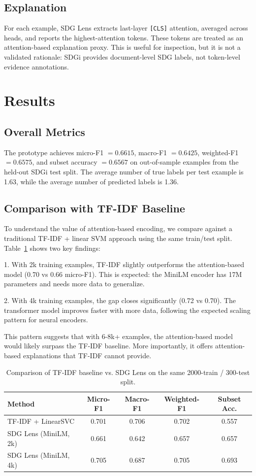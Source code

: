 \documentclass[10pt]{article}
\begin{document}
\subsection{Explanation}
For each example, SDG Lens extracts last-layer \texttt{[CLS]} attention,
averaged across heads, and reports the highest-attention tokens. These tokens
are treated as an attention-based explanation proxy. This is useful for
inspection, but it is not a validated rationale: SDGi provides document-level
SDG labels, not token-level evidence annotations.

\section{Results}
\subsection{Overall Metrics}
The prototype achieves micro-F1 $=0.6615$, macro-F1 $=0.6425$, weighted-F1
$=0.6575$, and subset accuracy $=0.6567$ on out-of-sample examples from the
held-out SDGi test split. The average number of true labels per test example is
1.63, while the average number of predicted labels is 1.36.

\subsection{Comparison with TF-IDF Baseline}
To understand the value of attention-based encoding, we compare against a
traditional TF-IDF + linear SVM approach using the same train/test split.
Table~\ref{tab:comparison} shows two key findings:

1. With 2k training examples, TF-IDF slightly outperforms the
attention-based model (0.70 vs 0.66 micro-F1). This is expected:
the MiniLM encoder has 17M parameters and needs more data to generalize.

2. With 4k training examples, the gap closes significantly (0.72 vs 0.70).
The transformer model improves faster with more data, following the
expected scaling pattern for neural encoders.

This pattern suggests that with 6-8k+ examples, the attention-based model
would likely surpass the TF-IDF baseline. More importantly, it offers
attention-based explanations that TF-IDF cannot provide.

\begin{table}[h]
\centering
\begin{tabular}{lcccc}
\toprule
Method & Micro-F1 & Macro-F1 & Weighted-F1 & Subset Acc. \\
\midrule
TF-IDF + LinearSVC & 0.701 & 0.706 & 0.702 & 0.557 \\
SDG Lens (MiniLM, 2k)   & 0.661 & 0.642 & 0.657 & 0.657 \\
SDG Lens (MiniLM, 4k)   & 0.705 & 0.687 & 0.705 & 0.693 \\
\bottomrule
\end{tabular}
\caption{Comparison of TF-IDF baseline vs. SDG Lens on the same 2000-train / 300-test split.}
\label{tab:comparison}
\end{table}
\end{document}
